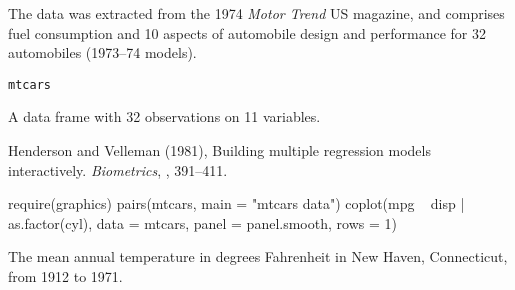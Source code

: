 %
\begin{Description}\relax
The data was extracted from the 1974 \emph{Motor Trend} US magazine,
and comprises fuel consumption and 10 aspects of
automobile design and performance for 32 automobiles (1973--74
models).
\end{Description}
%
\begin{Usage}
\begin{verbatim}
mtcars
\end{verbatim}
\end{Usage}
%
\begin{Format}
A data frame with 32 observations on 11 variables.

\end{Format}
%
\begin{Source}\relax
Henderson and Velleman (1981),
Building multiple regression models interactively.
\emph{Biometrics}, , 391--411.
\end{Source}
%
\begin{Examples}
\begin{ExampleCode}
require(graphics)
pairs(mtcars, main = "mtcars data")
coplot(mpg ~ disp | as.factor(cyl), data = mtcars,
       panel = panel.smooth, rows = 1)
\end{ExampleCode}
\end{Examples}
%
\begin{Description}\relax
The mean annual temperature in degrees Fahrenheit in New Haven,
Connecticut, from 1912 to 1971.
\end{Description}
